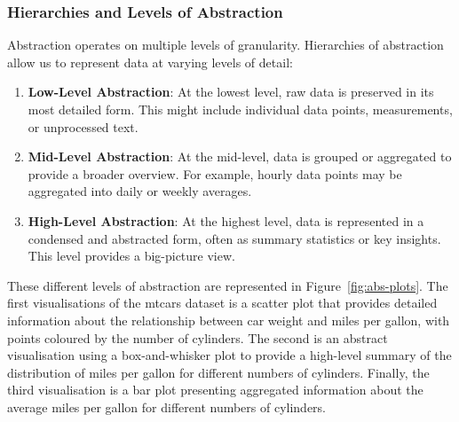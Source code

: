 \documentclass{article}\usepackage[]{graphicx}\usepackage[]{xcolor}
\numberwithin{equation}{section}
\begin{document}
\subsubsection{Hierarchies and Levels of Abstraction}
Abstraction operates on multiple levels of granularity. Hierarchies of abstraction allow us to represent data at varying levels of detail: 
\begin{enumerate}
    \item \textbf{Low-Level Abstraction}: At the lowest level, raw data is preserved in its most detailed form. This might include individual data points, measurements, or unprocessed text.
    \item \textbf{Mid-Level Abstraction}: At the mid-level, data is grouped or aggregated to provide a broader overview. For example, hourly data points may be aggregated into daily or weekly averages.
    \item \textbf{High-Level Abstraction}: At the highest level, data is represented in a condensed and abstracted form, often as summary statistics or key insights. This level provides a big-picture view.
\end{enumerate}

\noindent 
These different levels of abstraction are represented in Figure~\ref{fig:abs-plots}. The first visualisations of the mtcars dataset is a scatter plot that provides detailed information about the relationship between car weight and miles per gallon, with points coloured by the number of cylinders. The second is an abstract visualisation using a box-and-whisker plot to provide a high-level summary of the distribution of miles per gallon for different numbers of cylinders. Finally, the third visualisation is a bar plot presenting aggregated information about the average miles per gallon for different numbers of cylinders.
\end{document}
